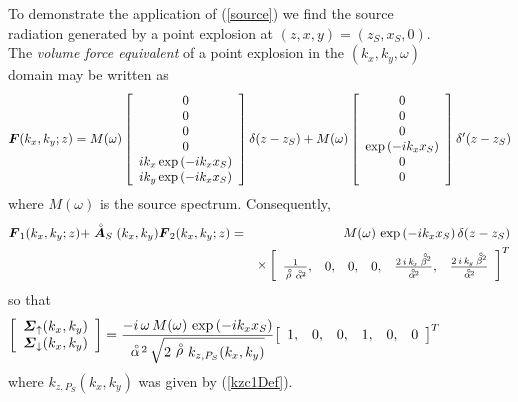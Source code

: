 \begin{figure}
{\begin{minipage} {140.0mm}
To demonstrate the application of (\ref{source}) we find the source 
radiation generated by a point explosion at $(z,x,y)=(z_S,x_S,0)$. The 
{\em volume force equivalent\/} of a point explosion in the $(k_x, k_y, \omega)$ 
domain may be written as
\[
{\mbox{\boldmath$\mit F$\unboldmath}}({k}_{x},{k}_{y};z)=M(\omega) \left[{\begin{array}{c}0\\0\\0\\0\\
i {k}_{x}\exp \left({-i {k}_{x}{x}_{S}}\right)\\
i {k}_{y}\exp \left({-i {k}_{x}{x}_{S}}\right)\end{array}}\right]
 \delta(z-{z}_{S})+ M(\omega)
 \left[{\begin{array}{c}0\\0\\0\\\exp \left({-i{k}_{x}{x}_{S}}\right)\\
0\\
0\end{array}}\right]{\delta }^{\prime}(z-{z}_{S})
\]
where $M(\omega)$ is the source spectrum.
Consequently,
\begin{eqnarray*}
{\mbox{\boldmath$\mit F$\unboldmath}}_{1}({k}_{x},{k}_{y};z)+
\stackrel{\scriptscriptstyle _{\,\,\circ}}{ \mbox{\boldmath$\mit A$\unboldmath}}_{S}({k}_{x},{k}_{y}){\mbox{\boldmath$\mit F$\unboldmath}}_{2}({k}_{x},{k}_{y};z)&=&M(\omega)\, \exp \left({-i 
{k}_{x}{x}_{S}}\right) {\delta }(z-{z}_{S})\\
&&\times
\left[ \begin{array}{cccccc}{1\over {{\stackrel{\scriptscriptstyle _{\,\,\circ}}{ \rho}\,\stackrel{\scriptscriptstyle _{\,\,\circ}}{ \alpha}\!{}^2} }}, &  0, 
& 0, & 0, & 
{{2\,i\,{\it k_x}\,{\stackrel{\scriptscriptstyle _{\,\,\circ}}{ \beta}\!{}^2}}\over {{\stackrel{\scriptscriptstyle _{\,\,\circ}}{ \alpha}\!{}^2}}}, &
  {{2\,i\,{\it k_y}\,{\stackrel{\scriptscriptstyle _{\,\,\circ}}{ \beta}\!{}^2}}\over {{\stackrel{\scriptscriptstyle _{\,\,\circ}}{ \alpha}\!{}^2}}}
  \end{array}\right]^{T}
\end{eqnarray*}
so that
\[
\left[{\begin{array}{c}
{\mbox{\boldmath$\mit \Sigma$\unboldmath}}_{ \uparrow }({k}_{x},{k}_{y})\\
{\mbox{\boldmath$\mit \Sigma$\unboldmath}}_{ \downarrow }({k}_{x},{k}_{y})\end{array}}\right]
={\frac{-i\, \omega\,  M( \omega)\,\exp \left({-i 
{k}_{x}{x}_{S}}\right)}{\stackrel{\scriptscriptstyle _{\,\,\circ}}{ \alpha}\!{}^2\,
\sqrt {2\stackrel{\scriptscriptstyle _{\,\,\circ}}{ \rho} { k}_{ z, P_S}({k}_{x},{k}_{y})}}}
{\left[{\begin{array}{cccccc}1,&0,&0,&1,&0,&0\end{array}}\right]}^{T}
\] 
where ${ k}_{ z, P_S}({k}_{x},{k}_{y})$ was given by (\ref{kzc1Def}).
\vspace{6 mm}
\end{minipage}
}
\end{figure}


